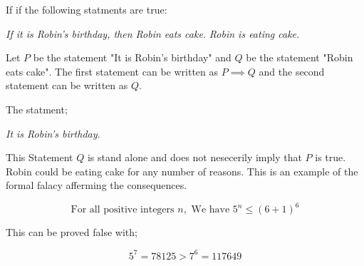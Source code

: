 \documentclass{tufte-handout}
\begin{document}
 


\begin{question}

\qpart

If if the following statments are true:

\begin{center}
\textit{If it is Robin's birthday, then Robin eats cake.}
\textit{Robin is eating cake.}
\end{center}

Let \( P \) be the statement "It is Robin's birthday" and \( Q \) be the statement "Robin eats cake".
The first statement can be written as \( P \implies Q \) and the second statement can be written as \( Q \).

The statment;
\begin{center}
\textit{It is Robin's birthday.}
\end{center}

This Statement \( Q \) is stand alone and does not nesecerily imply that \( P \) is true.
Robin could be eating cake for any number of reasons. This is an example of the formal falacy
afferming the consequences.

\vspace{3cm}

\qpart

\[ \text{For all positive integers } n, \text{ We have } 5^{n}\leq(6+1)^{6} \]

This can be proved false with;

\[ 5^{7} = 78125 > 7^{6} = 117649 \]

\end{question}

\end{document}
